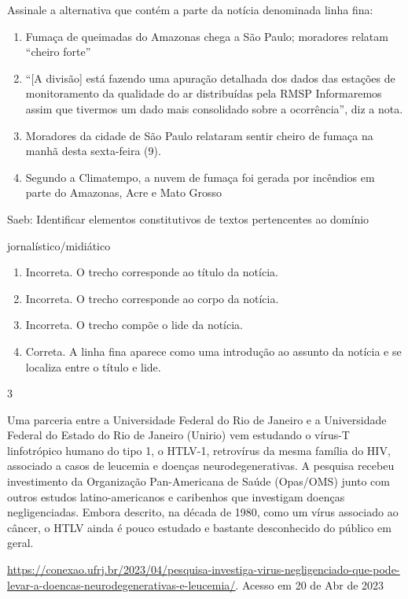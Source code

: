 {{\begin{itemize}
\begin{itemize}
Assinale a alternativa que contém a parte da notícia denominada linha
fina:

\begin{enumerate}
\def\labelenumi{\alph{enumi})}
\item
  Fumaça de queimadas do Amazonas chega a São Paulo; moradores relatam
  ``cheiro forte''
\item
  ``{[}A divisão{]} está fazendo uma apuração detalhada dos dados das
  estações de monitoramento da qualidade do ar distribuídas pela RMSP
  Informaremos assim que tivermos um dado mais consolidado sobre a
  ocorrência'', diz a nota.
\item
  Moradores da cidade de São Paulo relataram sentir cheiro de fumaça na
  manhã desta sexta-feira (9).
\item
  Segundo a Climatempo, a nuvem de fumaça foi gerada por incêndios em
  parte do Amazonas, Acre e Mato Grosso
\end{enumerate}

Saeb: Identificar elementos constitutivos de textos pertencentes ao
domínio

jornalístico/midiático

\begin{enumerate}
\def\labelenumi{\arabic{enumi}.}
\item
  Incorreta. O trecho corresponde ao título da notícia.
\item
  Incorreta. O trecho corresponde ao corpo da notícia.
\item
  Incorreta. O trecho compõe o lide da notícia.
\item
  Correta. A linha fina aparece como uma introdução ao assunto da
  notícia e se localiza entre o título e lide.
\end{enumerate}

\num{3}

Uma parceria entre a Universidade Federal do Rio de Janeiro e a
Universidade Federal do Estado do Rio de Janeiro (Unirio) vem estudando
o vírus-T linfotrópico humano do tipo 1, o HTLV-1, retrovírus da mesma
família do HIV, associado a casos de leucemia e doenças
neurodegenerativas. A pesquisa recebeu investimento da Organização
Pan-Americana de Saúde (Opas/OMS) junto com outros estudos
latino-americanos e caribenhos que investigam doenças negligenciadas.
Embora descrito, na década de 1980, como um vírus associado ao câncer, o
HTLV ainda é pouco estudado e bastante desconhecido do público em geral.

\href{https://conexao.ufrj.br/2023/04/pesquisa-investiga-virus-negligenciado-que-pode-levar-a-doencas-neurodegenerativas-e-leucemia/}{\uline{https://conexao.ufrj.br/2023/04/pesquisa-investiga-virus-negligenciado-que-pode-levar-a-doencas-neurodegenerativas-e-leucemia/}}.
Acesso em 20 de Abr de 2023


\end{itemize}
\end{itemize}}}
